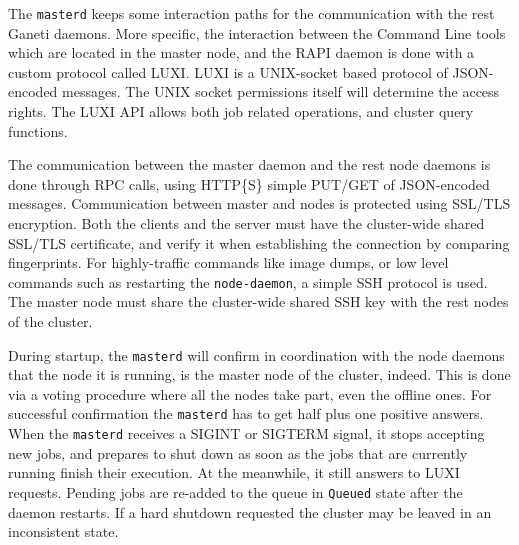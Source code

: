 \begin{description}
    The \texttt{masterd} keeps some interaction paths for the communication with
    the rest Ganeti daemons. More specific, the interaction between the Command
    Line tools which are located in the master node, and the RAPI daemon is done
    with a custom protocol called LUXI. LUXI is a UNIX-socket based protocol of
    JSON-encoded messages. The UNIX socket permissions itself will determine the
    access rights. The LUXI API allows both job related operations, and cluster
    query functions.

    The communication between the master daemon and the rest node daemons is
    done through RPC calls, using HTTP\{S\} simple PUT/GET of JSON-encoded
    messages. Communication between master and nodes is protected using SSL/TLS
    encryption. Both the clients and the server must have the cluster-wide
    shared SSL/TLS certificate, and verify it when establishing the connection
    by comparing fingerprints. For highly-traffic commands like image dumps, or
    low level commands such as restarting the \texttt{node-daemon}, a simple SSH
    protocol is used. The master node must share the cluster-wide shared SSH key
    with the rest nodes of the cluster.

    During startup, the \texttt{masterd} will confirm in coordination with the
    node daemons that the node it is running, is the master node of the cluster,
    indeed. This is done via a voting procedure where all the nodes take part,
    even the offline ones. For successful confirmation the \texttt{masterd} has
    to get half plus one positive answers. When the \texttt{masterd} receives a
    SIGINT or SIGTERM signal, it stops accepting new jobs, and prepares to shut
    down as soon as the jobs that are currently running finish their execution.
    At the meanwhile, it still answers to LUXI
    requests. Pending jobs are re-added to the queue in \texttt{Queued} state
    after the daemon restarts. If a hard shutdown requested the cluster may be
    leaved in an inconsistent state.


\end{description}
